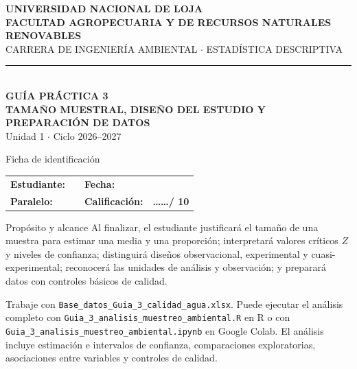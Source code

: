 \documentclass[11pt,a4paper]{article}
\begin{document}
\begin{bannerbox}
\centering
{\large\bfseries\color{white} UNIVERSIDAD NACIONAL DE LOJA}\\[2pt]
{\small\bfseries\color{white} FACULTAD AGROPECUARIA Y DE RECURSOS NATURALES RENOVABLES}\\[2pt]
{\footnotesize\color{white} CARRERA DE INGENIERÍA AMBIENTAL $\cdot$ ESTADÍSTICA DESCRIPTIVA}\\[4pt]
\rule{\linewidth}{0.5pt}\\[4pt]
{\Large\bfseries\color{white} GUÍA PRÁCTICA 3}\\[2pt]
{\normalsize\bfseries\color{white} TAMAÑO MUESTRAL, DISEÑO DEL ESTUDIO Y PREPARACIÓN DE DATOS}\\[3pt]
{\footnotesize\color{white} Unidad 1 $\cdot$ Ciclo 2026--2027}
\end{bannerbox}

\vspace{0.15cm}
\begin{casobox}{Ficha de identificación}
\small
\begin{tabularx}{\linewidth}{L{2.4cm}Y L{1.8cm}Y}
\textbf{Estudiante:} & \hrulefill & \textbf{Fecha:} & \hrulefill \\
\textbf{Paralelo:} & \hrulefill & \textbf{Calificación:} & \textbf{\dots\dots / 10} \\
\end{tabularx}
\end{casobox}

\begin{objetivobox}{Propósito y alcance}
Al finalizar, el estudiante justificará el tamaño de una muestra para estimar una media y una proporción; interpretará valores críticos $Z$ y niveles de confianza; distinguirá diseños observacional, experimental y cuasi-experimental; reconocerá las unidades de análisis y observación; y preparará datos con controles básicos de calidad.

Trabaje con \texttt{Base\_datos\_Guia\_3\_calidad\_agua.xlsx}. Puede ejecutar el análisis completo con \texttt{Guia\_3\_analisis\_muestreo\_ambiental.R} en R o con \texttt{Guia\_3\_analisis\_muestreo\_ambiental.ipynb} en Google Colab. El análisis incluye estimación e intervalos de confianza, comparaciones exploratorias, asociaciones entre variables y controles de calidad.
\end{objetivobox}
\end{document}
